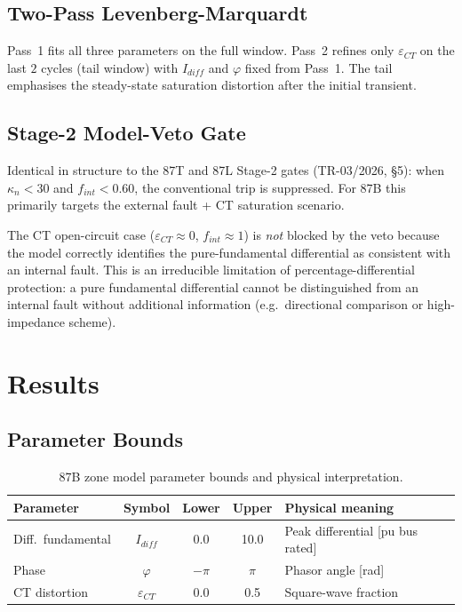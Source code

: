 \documentclass[12pt,a4paper]{article}
\newcommand{\kappan}{\kappa_n}
\begin{document}
\subsection{Two-Pass Levenberg-Marquardt}

Pass~1 fits all three parameters on the full window.  Pass~2 refines only
$\varepsilon_{CT}$ on the last $2$ cycles (tail window) with $I_{diff}$ and
$\varphi$ fixed from Pass~1.  The tail emphasises the steady-state saturation
distortion after the initial transient.

\subsection{Stage-2 Model-Veto Gate}

Identical in structure to the 87T and 87L Stage-2 gates (TR-03/2026, \S5):
when $\kappan < 30$ and $f_{int} < 0.60$, the conventional trip is suppressed.
For 87B this primarily targets the external fault + CT saturation scenario.

The CT open-circuit case ($\varepsilon_{CT} \approx 0$, $f_{int} \approx 1$)
is \emph{not} blocked by the veto because the model correctly identifies the
pure-fundamental differential as consistent with an internal fault.  This is
an irreducible limitation of percentage-differential protection: a pure
fundamental differential cannot be distinguished from an internal fault without
additional information (e.g.\ directional comparison or high-impedance scheme).

\section{Results}
\label{sec:results}

\subsection{Parameter Bounds}

\begin{table}[h!]
\centering
\caption{87B zone model parameter bounds and physical interpretation.}
\label{tab:87B_bounds}
\begin{tabular}{lcccp{5cm}}
\toprule
Parameter & Symbol & Lower & Upper & Physical meaning\\
\midrule
Diff.\ fundamental & $I_{diff}$    & 0.0  & 10.0 & Peak differential [pu bus rated]\\
Phase              & $\varphi$     & $-\pi$ & $\pi$ & Phasor angle [rad]\\
CT distortion      & $\varepsilon_{CT}$ & 0.0  & 0.5 & Square-wave fraction\\
\bottomrule
\end{tabular}
\end{table}
\end{document}
